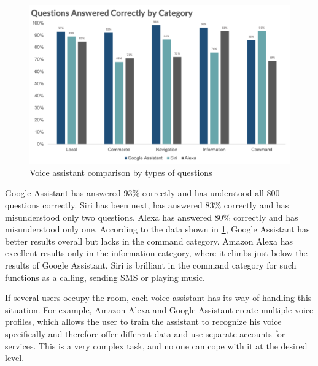 \begin{figure}[H]
    \centering
    \includegraphics[width=\textwidth]{img/voice_assistant_comparison.png}
    \caption{Voice assistant comparison by types of questions}
    \label{fig:voice_assistant_comparison}
\end{figure}

Google Assistant has answered 93\% correctly and has understood all 800 questions correctly. Siri has been next, has answered 83\% correctly and has misunderstood only two questions. Alexa has answered 80\% correctly and has misunderstood only one. According to the data shown in \cref{fig:voice_assistant_comparison}, Google Assistant has better results overall but lacks in the command category. Amazon Alexa has excellent results only in the information category, where it climbs just below the results of Google Assistant. Siri is brilliant in the command category for such functions as a calling, sending SMS or playing music.

If several users occupy the room, each voice assistant has its way of handling this situation. For example, Amazon Alexa and Google Assistant create multiple voice profiles, which allows the user to train the assistant to recognize his voice specifically and therefore offer different data and use separate accounts for services. This is a very complex task, and no one can cope with it at the desired level.





